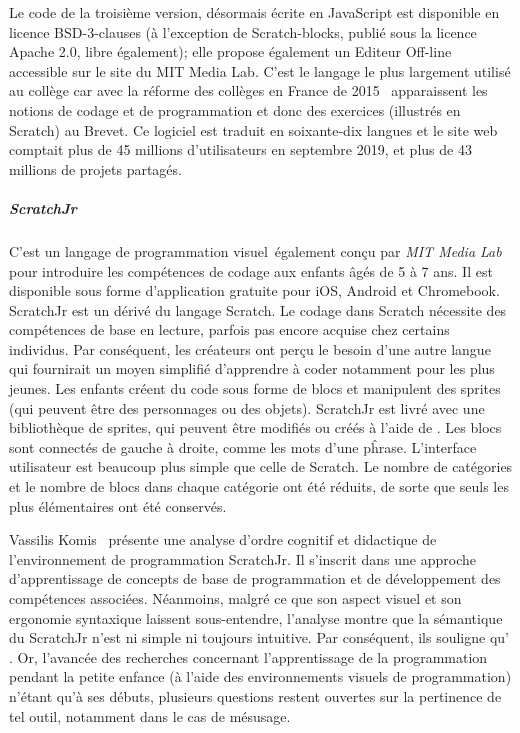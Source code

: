                     Le code de la troisième version, désormais écrite en JavaScript est disponible en licence BSD-3-clauses (à l’exception de Scratch-blocks, publié sous la licence Apache 2.0, libre également); elle propose également un Editeur Off-line accessible sur le site du MIT Media Lab. 
                    C'est le langage le plus largement utilisé au collège car avec la réforme des collèges en France de 2015~ apparaissent les notions de codage et de programmation et donc des exercices (illustrés en Scratch) au Brevet.
                    Ce logiciel est traduit en soixante-dix langues et le site web comptait plus de 45 millions d'utilisateurs en septembre 2019, et plus de 43 millions de projets partagés.
                \subparagraph{\texorpdfstring{\indent ScratchJr}{ScratchJr}}\label{sec:ScrtachJr}
                    C'est un langage de programmation visuel~également conçu par \textit{MIT Media Lab} pour introduire les compétences de codage aux enfants âgés de 5 à 7 ans. %
                    Il est disponible sous forme d'application gratuite pour iOS, Android et Chromebook.
                    ScratchJr est un dérivé du langage Scratch. Le codage dans Scratch nécessite des compétences de base en lecture, parfois pas encore acquise chez certains individus. Par conséquent, les créateurs ont perçu le besoin d’une autre langue qui fournirait un moyen simplifié d’apprendre à coder notamment pour les plus jeunes.
                    Les enfants créent du code sous forme de blocs  et manipulent des sprites (qui peuvent être des personnages ou des objets). ScratchJr est livré avec une bibliothèque de sprites, qui peuvent être modifiés ou créés à l’aide de .
                    Les blocs sont connectés de gauche à droite, comme les mots d'une pĥrase.
                    L'interface utilisateur est beaucoup plus simple que celle de Scratch. Le nombre de catégories et le nombre de blocs dans chaque catégorie ont été réduits, de sorte que seuls les plus élémentaires ont été conservés.\par%
                    Vassilis Komis~ présente une analyse d’ordre cognitif et didactique de l’environnement de programmation ScratchJr. Il s’inscrit dans une approche d’apprentissage de concepts de base de programmation et de développement des compétences associées. Néanmoins, malgré ce que son aspect visuel et son ergonomie syntaxique laissent sous-entendre, l'analyse montre que la sémantique du ScratchJr n’est ni simple ni toujours intuitive. Par conséquent, ils souligne qu' . Or, l'avancée des recherches concernant l’apprentissage de la programmation pendant la petite enfance (à l’aide des environnements visuels de programmation) n’étant qu’à ses débuts, plusieurs questions restent ouvertes sur la pertinence de tel outil, notamment dans le cas de mésusage.
